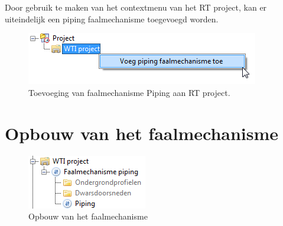 Door gebruik te maken van het contextmenu van het RT project, kan er uiteindelijk een piping faalmechanisme toegevoegd worden.

\begin{figure} [H]
	\centering
		\includegraphics{figures/chapter_piping/addPipingMechanismToProject}
	\caption{Toevoeging van faalmechanisme Piping aan RT project.}
	\label{fig:fig5.3}
\end{figure}


\section{Opbouw van het faalmechanisme}

\begin{figure} [H]
	\centering
		\includegraphics{figures/chapter_piping/OpbouwFaalmechanisme}
	\caption{Opbouw van het faalmechanisme}
	\label{fig:fig5.4}
\end{figure}

